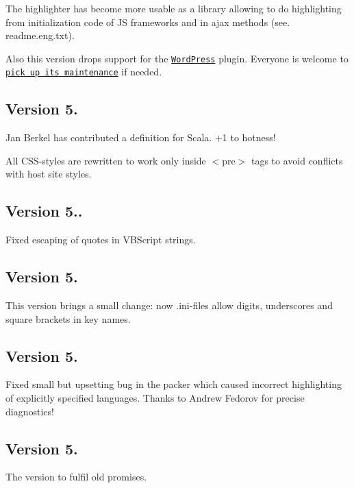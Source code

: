 The highlighter has become more usable as a library allowing to do highlighting from initialization code of JS frameworks and in ajax methods (see. readme.\+eng.\+txt).

Also this version drops support for the \href{http://wordpress.org/}{\tt Word\+Press} plugin. Everyone is welcome to \href{http://bazaar.launchpad.net/~isagalaev/+junk/highlight/annotate/342/src/wp_highlight.js.php}{\tt pick up its maintenance} if needed.

\subsection*{Version 5.}


\begin{DoxyItemize}
\item Jan Berkel has contributed a definition for Scala. +1 to hotness!
\item All C\+S\+S-\/styles are rewritten to work only inside {\ttfamily $<$pre$>$} tags to avoid conflicts with host site styles.
\end{DoxyItemize}

\subsection*{Version 5..}

Fixed escaping of quotes in V\+B\+Script strings.

\subsection*{Version 5.}

This version brings a small change\+: now .ini-\/files allow digits, underscores and square brackets in key names.

\subsection*{Version 5.}

Fixed small but upsetting bug in the packer which caused incorrect highlighting of explicitly specified languages. Thanks to Andrew Fedorov for precise diagnostics!

\subsection*{Version 5.}

The version to fulfil old promises.

